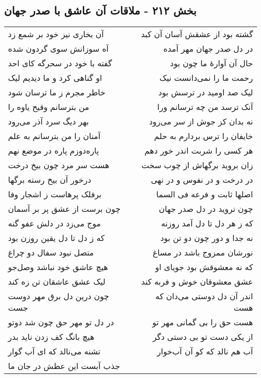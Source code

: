 \begin{center}
\section*{بخش ۲۱۲ - ملاقات آن عاشق با صدر جهان}
\label{sec:sh212}
\begin{longtable}{l p{0.5cm} r}
آن بخاری نیز خود بر شمع زد
&&
گشته بود از عشقش آسان آن کبد
\\
آه سوزانش سوی گردون شده
&&
در دل صدر جهان مهر آمده
\\
گفته با خود در سحرگه کای احد
&&
حال آن آوارهٔ ما چون بود
\\
او گناهی کرد و ما دیدیم لیک
&&
رحمت ما را نمی‌دانست نیک
\\
خاطر مجرم ز ما ترسان شود
&&
لیک صد اومید در ترسش بود
\\
من بترسانم وقیح یاوه را
&&
آنک ترسد من چه ترسانم ورا
\\
بهر دیگ سرد آذر می‌رود
&&
نه بدان کز جوش از سر می‌رود
\\
آمنان را من بترسانم به علم
&&
خایفان را ترس بردارم به حلم
\\
پاره‌دوزم پاره در موضع نهم
&&
هر کسی را شربت اندر خور دهم
\\
هست سر مرد چون بیخ درخت
&&
زان بروید برگهاش از چوب سخت
\\
درخور آن بیخ رسته برگها
&&
در درخت و در نفوس و در نهی
\\
برفلک پرهاست ز اشجار وفا
&&
اصلها ثابت و فرعه فی السما
\\
چون برست از عشق پر بر آسمان
&&
چون نروید در دل صدر جهان
\\
موج می‌زد در دلش عفو گنه
&&
که ز هر دل تا دل آمد روزنه
\\
که ز دل تا دل یقین روزن بود
&&
نه جدا و دور چون دو تن بود
\\
متصل نبود سفال دو چراغ
&&
نورشان ممزوج باشد در مساغ
\\
هیچ عاشق خود نباشد وصل‌جو
&&
که نه معشوقش بود جویای او
\\
لیک عشق عاشقان تن زه کند
&&
عشق معشوقان خوش و فربه کند
\\
چون درین دل برق مهر دوست جست
&&
اندر آن دل دوستی می‌دان که هست
\\
در دل تو مهر حق چون شد دوتو
&&
هست حق را بی گمانی مهر تو
\\
هیچ بانگ کف زدن ناید بدر
&&
از یکی دست تو بی دستی دگر
\\
تشنه می‌نالد که ای آب گوار
&&
آب هم نالد که کو آن آب‌خوار
\\
جذب آبست این عطش در جان ما

\end{longtable}
\end{center}
